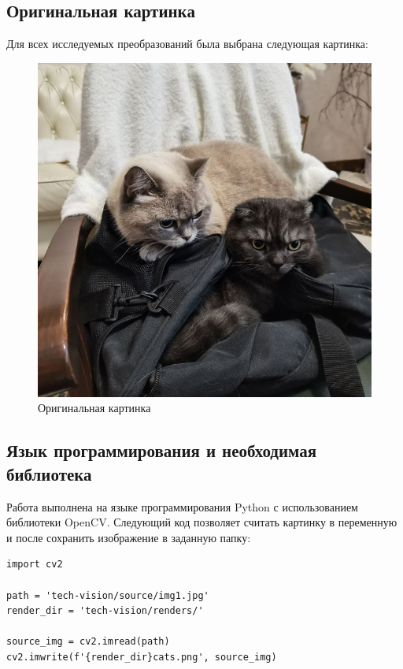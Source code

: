 \documentclass[a4paper, 16pt]{article}
\begin{document}
\subsection{Оригинальная картинка}
Для всех исследуемых преобразований была выбрана следующая картинка:
\begin{figure}[!htb]
    \centering
    \includegraphics[scale=0.3]{img1.jpg}
    \captionsetup{skip=0pt}
    \caption{Оригинальная картинка}
    \label{Рис:1}
\end{figure}


\subsection{Язык программирования и необходимая библиотека}
\noindent Работа выполнена на языке программирования Python с использованием библиотеки OpenCV. Следующий 
код позволяет считать картинку в переменную и после сохранить изображение в заданную папку:
\begin{lstlisting}[label=start-code,caption=Пример использования библиотеки OpenCV на python]
import cv2

path = 'tech-vision/source/img1.jpg'
render_dir = 'tech-vision/renders/'

source_img = cv2.imread(path)
cv2.imwrite(f'{render_dir}cats.png', source_img)
\end{lstlisting}
\end{document}
